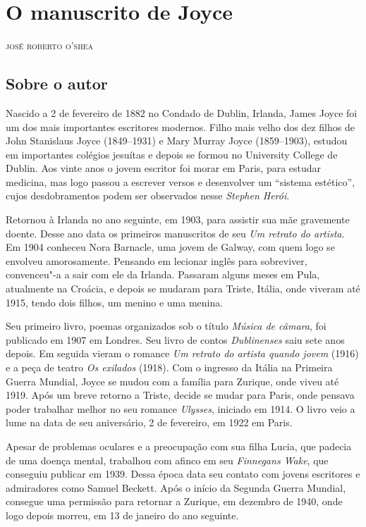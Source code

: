 \chapter{O manuscrito de Joyce}

\begin{flushright}
\textsc{josé roberto o'shea}
\end{flushright}

\section{Sobre o autor}

\noindent{}Nascido a 2 de fevereiro de 1882 no Condado de Dublin, Irlanda, James Joyce foi um dos mais importantes escritores modernos. Filho mais velho dos dez filhos de John Stanislaus Joyce (1849--1931) e Mary Murray Joyce (1859--1903), estudou em importantes colégios jesuítas e depois se formou no University College de Dublin. Aos vinte anos o jovem escritor foi morar em Paris, para estudar medicina, mas logo passou a escrever versos e desenvolver um ``sistema estético'', cujos desdobramentos podem ser observados nesse \textit{Stephen Herói}.

Retornou à Irlanda no ano seguinte, em 1903, para assistir sua mãe gravemente doente. Desse ano data os primeiros manuscritos de seu \emph{Um retrato do artista}. 
Em 1904 conheceu Nora Barnacle, uma jovem de Galway, com quem logo se envolveu amorosamente.
Pensando em lecionar inglês para sobreviver, convenceu"-a a sair com ele da Irlanda.
Passaram alguns meses em Pula, atualmente na Croácia, e depois se mudaram para Triste, Itália, onde viveram até 1915, tendo dois filhos, um menino e uma menina.

Seu primeiro livro, poemas organizados sob o título \textit{Música de câmara}, foi publicado em 1907 em Londres. Seu livro de contos \textit{Dublinenses} saiu sete anos depois. Em seguida vieram o romance \textit{Um retrato do artista quando jovem} (1916) e a peça de teatro \textit{Os exilados} (1918).
Com o ingresso da Itália na Primeira Guerra Mundial, Joyce se mudou com a família para Zurique, onde viveu até 1919. Após um breve retorno a Triste, decide se mudar para Paris, onde pensava poder trabalhar melhor no seu romance \textit{Ulysses}, iniciado em 1914.
O livro veio a lume na data de seu aniversário, 2 de fevereiro, em 1922 em Paris.

Apesar de problemas oculares e a preocupação com sua filha Lucia, que padecia de uma doença mental, trabalhou com afinco em seu \textit{Finnegans Wake}, que conseguiu publicar em 1939.
Dessa época data seu contato com jovens escritores e admiradores como Samuel Beckett.
Após o início da Segunda Guerra Mundial, consegue uma permissão para retornar a Zurique, em dezembro de 1940, onde logo depois morreu, em 13 de janeiro do ano seguinte.


